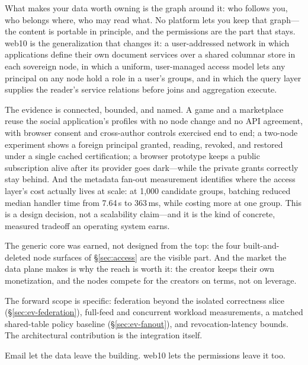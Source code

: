\documentclass[sigconf, nonacm]{acmart}
\begin{document}
What makes your data worth owning is the graph around it: who follows
you, who belongs where, who may read what. No platform lets you keep that
graph---the content is portable in principle, and the permissions are
the part that stays. web10 is the generalization that changes it: a
user-addressed network in which applications define their own document
services over a shared columnar store in each sovereign node, in which a
uniform, user-managed access model lets any principal on any node hold a
role in a user's groups, and in which the query layer supplies the
reader's service relations before joins and aggregation execute.

The evidence is connected, bounded, and named. A game and a marketplace
reuse the social application's profiles with no node change and no API
agreement, with browser consent and cross-author controls exercised end
to end; a two-node experiment shows a foreign principal granted, reading,
revoked, and restored under a single cached certification; a browser
prototype keeps a public subscription alive after its provider goes
dark---while the private grants correctly stay behind. And the metadata
fan-out measurement identifies where the access layer's cost actually
lives at scale: at 1,000 candidate groups, batching reduced median
handler time from 7.64\,s to 363\,ms, while costing more at one group.
This is a design decision, not a scalability claim---and it is the kind
of concrete, measured tradeoff an operating system earns.

The generic core was earned, not designed from the top: the four
built-and-deleted node surfaces of \S\ref{sec:access} are the visible
part. And the market the data plane makes is why the reach is worth it:
the creator keeps their own monetization, and the nodes compete for the
creators on terms, not on leverage.

The forward scope is specific: federation beyond the isolated
correctness slice (\S\ref{sec:ev-federation}), full-feed and concurrent
workload measurements, a matched shared-table policy baseline
(\S\ref{sec:ev-fanout}), and revocation-latency bounds. The architectural
contribution is the integration itself.

Email let the data leave the building. web10 lets the permissions leave
it too.



\end{document}

